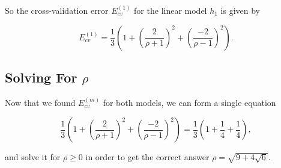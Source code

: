 \documentclass{article}
\begin{document}
So the cross-validation error $E_{cv}^{(1)}$ for the linear model $h_1$ is given
by

\begin{equation*}
E_{cv}^{(1)} = \frac{1}{3} \left( 1 + \left(\frac{2}{\rho+1}\right)^2 +
 \left(\frac{-2}{\rho-1}\right)^2 \right).
\end{equation*}

\subsection{Solving For $\rho$}

Now that we found $E_{cv}^{(m)}$ for both models, we can form a single equation

\begin{equation*}
\frac{1}{3} \left( 1 + \left(\frac{2}{\rho+1}\right)^2 + \left(\frac{-2}{\rho-1}\right)^2 \right) =
\frac{1}{3} \left( 1 + \frac{1}{4} + \frac{1}{4} \right),
\end{equation*}

and solve it for $\rho \geq 0$ in order to get the correct answer
$\rho=\sqrt{9+4\sqrt{6}}$.
\end{document}
